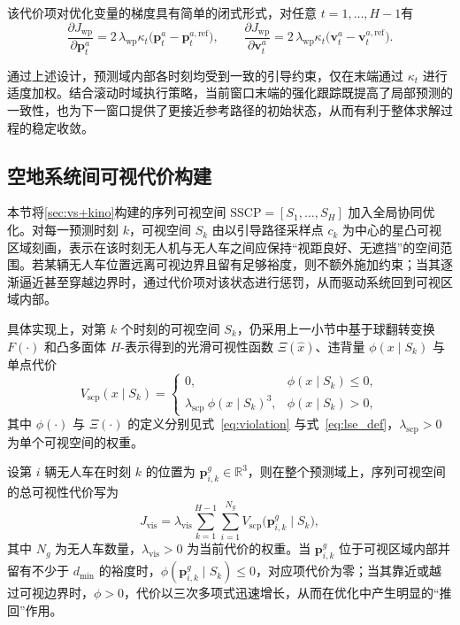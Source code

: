 该代价项对优化变量的梯度具有简单的闭式形式，对任意 \(t=1,\dots,H-1\)有
\begin{equation}
\frac{\partial J_{\mathrm{wp}}}{\partial \mathbf{p}^a_{t}}
=2\,\lambda_{\mathrm{wp}}\kappa_t\big(\mathbf{p}^a_{t}-\mathbf{p}^{a,\mathrm{ref}}_{t}\big),\qquad
\frac{\partial J_{\mathrm{wp}}}{\partial \mathbf{v}^a_{t}}
=2\,\lambda_{\mathrm{wp}}\kappa_t\big(\mathbf{v}^a_{t}-\mathbf{v}^{a,\mathrm{ref}}_{t}\big).
\label{eq:grad_J_wp_simplified}
\end{equation}

通过上述设计，预测域内部各时刻均受到一致的引导约束，仅在末端通过 \(\kappa_t\) 进行适度加权。结合滚动时域执行策略，当前窗口末端的强化跟踪既提高了局部预测的一致性，也为下一窗口提供了更接近参考路径的初始状态，从而有利于整体求解过程的稳定收敛。


\subsection{空地系统间可视代价构建}

本节将\autoref{sec:vs+kino}构建的序列可视空间 \(\mathrm{SSCP}=[S_1,\dots,S_H]\) 加入全局协同优化。对每一预测时刻 \(k\)，可视空间 \(S_k\) 由以引导路径采样点 \(c_k\) 为中心的星凸可视区域刻画，表示在该时刻无人机与无人车之间应保持“视距良好、无遮挡”的空间范围。若某辆无人车位置远离可视边界且留有足够裕度，则不额外施加约束；当其逐渐逼近甚至穿越边界时，通过代价项对该状态进行惩罚，从而驱动系统回到可视区域内部。

具体实现上，对第 \(k\) 个时刻的可视空间 \(S_k\)，仍采用上一小节中基于球翻转变换 \(F(\cdot)\) 和凸多面体 \(H\)-表示得到的光滑可视性函数 \(\Xi(\hat{x})\)、违背量 \(\phi(x\mid S_k)\) 与单点代价
\begin{equation}
V_{\mathrm{scp}}(x\mid S_k)=
\begin{cases}
0,& \phi(x\mid S_k)\le 0,\\[3pt]
\lambda_{\mathrm{scp}}\ \phi(x\mid S_k)^{3},& \phi(x\mid S_k)>0,
\end{cases}
\label{eq:sscp_Vscp}
\end{equation}
其中 \(\phi(\cdot)\) 与 \(\Xi(\cdot)\) 的定义分别见式~\eqref{eq:violation} 与式~\eqref{eq:lse_def}，\(\lambda_{\mathrm{scp}}>0\) 为单个可视空间的权重。

设第 \(i\) 辆无人车在时刻 \(k\) 的位置为 \(\mathbf{p}^{g}_{i,k}\in\mathbb{R}^3\)，则在整个预测域上，序列可视空间的总可视性代价写为
\begin{equation}
J_{\mathrm{vis}}
=\lambda_{\mathrm{vis}}\sum_{k=1}^{H-1}\sum_{i=1}^{N_g}
V_{\mathrm{scp}}\big(\mathbf{p}^{g}_{i,k}\mid S_k\big),
\label{eq:sscp_Jvis}
\end{equation}
其中 \(N_g\) 为无人车数量，\(\lambda_{\mathrm{vis}}>0\) 为当前代价的权重。当 \(\mathbf{p}^{g}_{i,k}\) 位于可视区域内部并留有不少于 \(d_{\min}\) 的裕度时，\(\phi(\mathbf{p}^{g}_{i,k}\mid S_k)\le 0\)，对应项代价为零；当其靠近或越过可视边界时，\(\phi>0\)，代价以三次多项式迅速增长，从而在优化中产生明显的“推回”作用。

